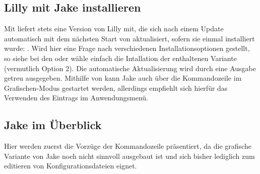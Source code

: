 \subsection{Lilly mit Jake installieren}
Mit  liefert \Jake stets eine Version von Lilly mit, die sich nach einem Update automatisch mit dem nächsten Start von \Jake aktualisiert, sofern sie einmal installiert wurde: . Wird hier eine Frage nach verschiedenen Installationsoptionen gestellt, so siehe bei den  oder wähle einfach die Intallation der enthaltenen Variante (vermutlich Option $2$). Die automatische Aktualisierung wird durch eine Ausgabe getreu  ausgegeben. Mithilfe von  kann Jake auch über die Kommandozeile im Grafischen-Modus gestartet werden, allerdings empfiehlt sich hierfür das Verwenden des Eintrags im Anwendungsmenü.

\subsection{Jake im Überblick}
Hier werden zuerst die Vorzüge der Kommandozeile präsentiert, da die grafische Variante von Jake noch nicht sinnvoll ausgebaut ist und sich bisher lediglich zum editieren von Konfigurationsdateien eignet.
